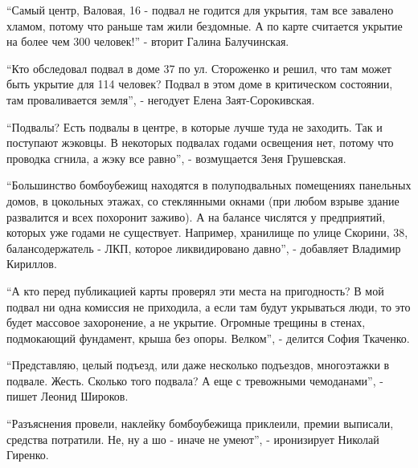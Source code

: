 
\enquote{Самый центр, Валовая, 16 - подвал не годится для укрытия, там все завалено
хламом, потому что раньше там жили бездомные. А по карте считается укрытие на
более чем 300 человек!} - вторит Галина Балучинская.

\enquote{Кто обследовал подвал в доме 37 по ул. Стороженко и решил, что там может быть
укрытие для 114 человек? Подвал в этом доме в критическом состоянии, там
проваливается земля}, - негодует Елена Заят-Сорокивская.

\enquote{Подвалы? Есть подвалы в центре, в которые лучше туда не заходить. Так и
поступают жэковцы. В некоторых подвалах годами освещения нет, потому что
проводка сгнила, а жэку все равно}, - возмущается Зеня Грушевская.

\enquote{Большинство бомбоубежищ находятся в полуподвальных помещениях панельных домов,
в цокольных этажах, со стеклянными окнами (при любом взрыве здание развалится и
всех похоронит заживо). А на балансе числятся у предприятий, которых уже годами
не существует. Например, хранилище по улице Скорини, 38, балансодержатель -
ЛКП, которое ликвидировано давно}, - добавляет Владимир Кириллов.

\enquote{А кто перед публикацией карты проверял эти места на пригодность? В мой подвал
ни одна комиссия не приходила, а если там будут укрываться люди, то это будет
массовое захоронение, а не укрытие. Огромные трещины в стенах, подмокающий
фундамент, крыша без опоры. Велком}, - делится София Ткаченко. 

\enquote{Представляю, целый подъезд, или даже несколько подъездов, многоэтажки в
подвале. Жесть. Сколько того подвала? А еще с тревожными чемоданами}, - пишет
Леонид Широков.

\enquote{Разъяснения провели, наклейку бомбоубежища приклеили, премии выписали,
средства потратили. Не, ну а шо - иначе не умеют}, - иронизирует Николай
Гиренко.
